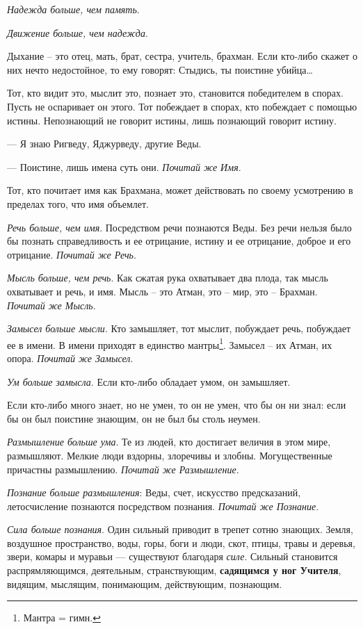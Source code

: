 \textit{Надежда больше, чем память}.

\textit{Движение больше, чем надежда}.

Дыхание – это отец, мать, брат, сестра, учитель, брахман. Если кто-либо скажет о них нечто недостойное, то ему говорят:
\flqq Стыдись, ты поистине убийца…\frqq

Тот, кто видит это, мыслит это, познает это, становится победителем в спорах. Пусть не оспаривает он этого. Тот
побеждает в спорах, кто побеждает с помощью истины. Непознающий не говорит истины, лишь познающий говорит истину.

— Я знаю Ригведу, Яджурведу, другие Веды.

— Поистине, лишь имена суть они. \textit{Почитай же Имя}.

Тот, кто почитает имя как Брахмана, может действовать по своему усмотрению в пределах того, что имя объемлет.

\textit{Речь больше, чем имя}. Посредством речи познаются Веды. Без речи нельзя было бы познать справедливость и ее
отрицание, истину и ее отрицание, доброе и его отрицание. \textit{Почитай же Речь}.

\textit{Мысль больше, чем речь}. Как сжатая рука охватывает два плода, так мысль охватывает и речь, и имя. Мысль – это
Атман, это – мир, это – Брахман. \textit{Почитай же Мысль}.

\textit{Замысел больше мысли}. Кто замышляет, тот мыслит, побуждает речь, побуждает ее в имени. В имени приходят в
единство мантры\footnote{Мантра = гимн.}. Замысел – их Атман, их опора. \textit{Почитай же Замысел}.

\textit{Ум больше замысла}. Если кто-либо обладает умом, он замышляет.

Если кто-либо много знает, но не умен, то он не умен, что бы он ни знал: если бы он был поистине знающим, он не был бы
столь неумен.

\textit{Размышление больше ума}. Те из людей, кто достигает величия в этом мире, размышляют. Мелкие люди вздорны,
злоречивы и злобны. Могущественные причастны размышлению. \textit{Почитай же Размышление}.

\textit{Познание больше размышления}: Веды, счет, искусство предсказаний, летосчисление познаются посредством познания.
\textit{Почитай же Познание}.

\textit{Сила больше познания}. Один сильный приводит в трепет сотню знающих. Земля, воздушное пространство, воды, горы,
боги и люди, скот, птицы, травы и деревья, звери, комары и муравьи — существуют благодаря \textit{силе}. Сильный
становится распрямляющимся, деятельным, странствующим, \textbf{садящимся у ног Учителя}, видящим, мыслящим, понимающим,
действующим, познающим.



